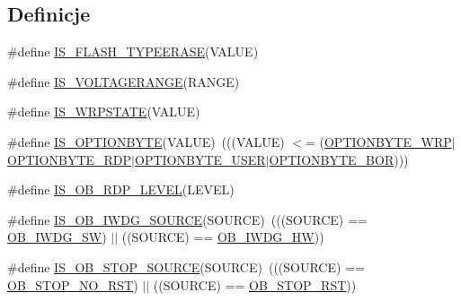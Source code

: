 \subsection*{Definicje}
\begin{DoxyCompactItemize}
\item 
\#define \hyperlink{group___f_l_a_s_h_ex___i_s___f_l_a_s_h___definitions_gaf15a6822d2421a33b6857059348ab476}{I\+S\+\_\+\+F\+L\+A\+S\+H\+\_\+\+T\+Y\+P\+E\+E\+R\+A\+SE}(V\+A\+L\+UE)
\item 
\#define \hyperlink{group___f_l_a_s_h_ex___i_s___f_l_a_s_h___definitions_gaa9682aea9d9ceebca83c48e53f9f6028}{I\+S\+\_\+\+V\+O\+L\+T\+A\+G\+E\+R\+A\+N\+GE}(R\+A\+N\+GE)
\item 
\#define \hyperlink{group___f_l_a_s_h_ex___i_s___f_l_a_s_h___definitions_ga8164622401a6cacf006679166de93c21}{I\+S\+\_\+\+W\+R\+P\+S\+T\+A\+TE}(V\+A\+L\+UE)
\item 
\#define \hyperlink{group___f_l_a_s_h_ex___i_s___f_l_a_s_h___definitions_ga87cd48c2373f47668470a38892ed07e3}{I\+S\+\_\+\+O\+P\+T\+I\+O\+N\+B\+Y\+TE}(V\+A\+L\+UE)~(((V\+A\+L\+UE) $<$= (\hyperlink{group___f_l_a_s_h_ex___option___type_ga48712a166ea192ddcda0f2653679f9ec}{O\+P\+T\+I\+O\+N\+B\+Y\+T\+E\+\_\+\+W\+RP}$\vert$\hyperlink{group___f_l_a_s_h_ex___option___type_ga8f0bdb21ef13bae39d5d8b6619e2df06}{O\+P\+T\+I\+O\+N\+B\+Y\+T\+E\+\_\+\+R\+DP}$\vert$\hyperlink{group___f_l_a_s_h_ex___option___type_gac7d843e666e15c79688a1914e8ffe7a5}{O\+P\+T\+I\+O\+N\+B\+Y\+T\+E\+\_\+\+U\+S\+ER}$\vert$\hyperlink{group___f_l_a_s_h_ex___option___type_gaf4063216c8386467d187663190936c07}{O\+P\+T\+I\+O\+N\+B\+Y\+T\+E\+\_\+\+B\+OR})))
\item 
\#define \hyperlink{group___f_l_a_s_h_ex___i_s___f_l_a_s_h___definitions_ga8d602a97cd688390b3d1956d9970e712}{I\+S\+\_\+\+O\+B\+\_\+\+R\+D\+P\+\_\+\+L\+E\+V\+EL}(L\+E\+V\+EL)
\item 
\#define \hyperlink{group___f_l_a_s_h_ex___i_s___f_l_a_s_h___definitions_gaf2871652c08e76499d9449be6556f12c}{I\+S\+\_\+\+O\+B\+\_\+\+I\+W\+D\+G\+\_\+\+S\+O\+U\+R\+CE}(S\+O\+U\+R\+CE)~(((S\+O\+U\+R\+CE) == \hyperlink{group___f_l_a_s_h_ex___option___bytes___i_watchdog_ga5a357e232c955444c3f2ccb9a937ffce}{O\+B\+\_\+\+I\+W\+D\+G\+\_\+\+SW}) $\vert$$\vert$ ((S\+O\+U\+R\+CE) == \hyperlink{group___f_l_a_s_h_ex___option___bytes___i_watchdog_gadfcbfa963d79c339ec8e2d5a7734e47a}{O\+B\+\_\+\+I\+W\+D\+G\+\_\+\+HW}))
\item 
\#define \hyperlink{group___f_l_a_s_h_ex___i_s___f_l_a_s_h___definitions_ga131ae3434f300c8317dd6b3b349c7cab}{I\+S\+\_\+\+O\+B\+\_\+\+S\+T\+O\+P\+\_\+\+S\+O\+U\+R\+CE}(S\+O\+U\+R\+CE)~(((S\+O\+U\+R\+CE) == \hyperlink{group___f_l_a_s_h_ex___option___bytes__n_r_s_t___s_t_o_p_ga7344fe0ec25c5eb2d11db7c855325436}{O\+B\+\_\+\+S\+T\+O\+P\+\_\+\+N\+O\+\_\+\+R\+ST}) $\vert$$\vert$ ((S\+O\+U\+R\+CE) == \hyperlink{group___f_l_a_s_h_ex___option___bytes__n_r_s_t___s_t_o_p_gaef92c03b1f279c532bfa13d3bb074b57}{O\+B\+\_\+\+S\+T\+O\+P\+\_\+\+R\+ST}))

\end{DoxyCompactItemize}

